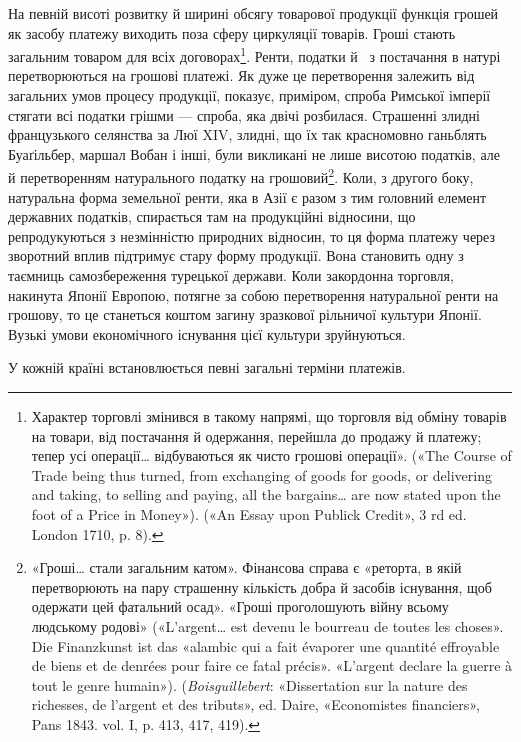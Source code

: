 На певній висоті розвитку й ширині обсягу товарової продукції функція грошей як засобу платежу
виходить поза сферу циркуляції товарів. Гроші стають загальним товаром для всіх
договорах\footnote{
Характер торговлі змінився в такому напрямі, що торговля від
обміну товарів на товари, від постачання й одержання, перейшла до продажу
й платежу; тепер усі операції\dots{} відбуваються як чисто грошові
операції». («The Course of Trade being thus turned, from exchanging of
goods for goods, or delivering and taking, to selling and paying, all the
bargains\dots{} are now stated upon the foot of a Price in Money»). («An Essay
upon Publick Credit», 3 rd ed. London 1710, p. 8).
}. Ренти, податки й~ з постачання в натурі перетворюються
на грошові платежі. Як дуже це перетворення
залежить від загальних умов процесу продукції, показує, приміром,
спроба Римської імперії стягати всі податки грішми —
спроба, яка двічі розбилася. Страшенні злидні французького
селянства за Люї XIV, злидні, що їх так красномовно ганьблять
Буаґільбер, маршал Вобан і інші, були викликані не лише висотою
податків, але й перетворенням натурального податку на
грошовий\footnote{
«Гроші\dots{} стали загальним катом». Фінансова справа є «реторта, в
якій перетворюють на пару страшенну кількість добра й засобів існування,
щоб одержати цей фатальний осад». «Гроші проголошують війну всьому
людському родові» («L’argent\dots{} est devenu le bourreau de toutes les choses».
Die Finanzkunst ist das «alambic qui a fait évaporer une quantité
effroyable de biens et de denrées pour faire ce fatal précis». «L’argent declare
la guerre à tout le genre humain»). (\emph{Boisguillebert}: «Dissertation sur la
nature des richesses, de l’argent et des tributs», ed. Daire, «Economistes
financiers», Pans 1843. vol. I, p. 413, 417, 419).
}. Коли, з другого боку, натуральна форма земельної
ренти, яка в Азії є разом з тим головний елемент державних
податків, спирається там на продукційні відносини, що репродукуються
з незмінністю природних відносин, то ця форма платежу
через зворотний вплив підтримує стару форму продукції. Вона
становить одну з таємниць самозбереження турецької держави.
Коли закордонна торговля, накинута Японії Европою, потягне
за собою перетворення натуральної ренти на грошову, то це
станеться коштом загину зразкової рільничої культури Японії.
Вузькі умови економічного існування цієї культури зруйнуються.

У кожній країні встановлюється певні загальні терміни платежів.

